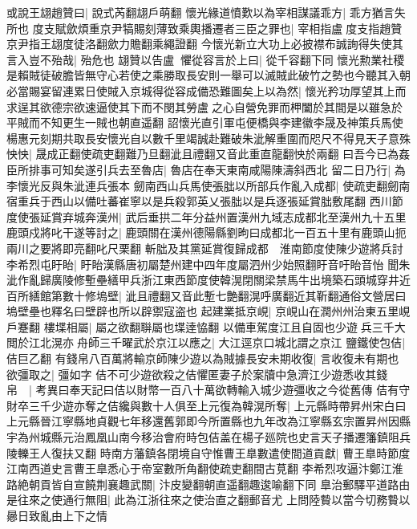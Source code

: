 或說王翃趙贊曰|{
	說式芮翻翃戶萌翻}
懷光緣道憤歎以為宰相謀議乖方|{
	乖方猶言失所也}
度支賦歛煩重京尹犒賜刻薄致乘輿播遷者三臣之罪也|{
	宰相指盧度支指趙贊京尹指王翃度徒洛翻歛力贍翻乘繩證翻}
今懷光新立大功上必披襟布誠詢得失使其言入豈不殆哉|{
	殆危也}
翃贊以告盧懼從容言於上曰|{
	從千容翻下同}
懷光勲業社稷是賴賊徒破膽皆無守心若使之乘勝取長安則一舉可以滅賊此破竹之勢也今聽其入朝必當賜宴留連累日使賊入京城得從容成備恐難圖矣上以為然|{
	懷光矜功厚望其上而求逞其欲德宗欲速逼使其下而不閔其勞盧之心自營免罪而柙闔於其間是以雖急於平賊而不知更生一賊也朝直遥翻}
詔懷光直引軍屯便橋與李建徽李晟及神策兵馬使楊惠元刻期共取長安懷光自以數千里竭誠赴難破朱泚解重圍而咫尺不得見天子意殊怏怏|{
	晟成正翻使疏吏翻難乃旦翻泚且禮翻又音此重直龍翻怏於兩翻}
曰吾今已為姦臣所排事可知矣遂引兵去至魯店|{
	魯店在奉天東南咸陽陳濤斜西北}
留二日乃行|{
	為李懷光反與朱泚連兵張本}
劒南西山兵馬使張朏以所部兵作亂入成都|{
	使疏吏翻劒南宿重兵于西山以備吐蕃崔寧以是兵殺郭英乂張朏以是兵逐張延賞朏敷尾翻}
西川節度使張延賞弃城奔漢州|{
	武后垂拱二年分益州置漢州九域志成都北至漢州九十五里}
鹿頭戍將叱干遂等討之|{
	鹿頭關在漢州德陽縣劉昫曰成都北一百五十里有鹿頭山扼兩川之要將即亮翻叱尺栗翻}
斬朏及其黨延賞復歸成都　淮南節度使陳少遊將兵討李希烈屯盱眙|{
	盱眙漢縣唐初屬楚州建中四年度屬泗州少始照翻盱音吁眙音怡}
聞朱泚作亂歸廣陵修塹壘繕甲兵浙江東西節度使韓滉閉關梁禁馬牛出境築石頭城穿井近百所繕館第數十修塢壁|{
	泚且禮翻又音此塹七艶翻滉呼廣翻近其靳翻通俗文營居曰塢壁壘也釋名曰壁辟也所以辟禦寇盗也}
起建業抵京峴|{
	京峴山在潤州州治東五里峴戶蹇翻}
樓堞相屬|{
	屬之欲翻聨屬也堞逹恊翻}
以備車駕度江且自固也少遊兵三千大閲於江北滉亦舟師三千曜武於京江以應之|{
	大江逕京口城北謂之京江}
鹽鐵使包佶|{
	佶巨乙翻}
有錢帛八百萬將輸京師陳少遊以為賊據長安未期收復|{
	言收復未有期也}
欲彊取之|{
	彊如字}
佶不可少遊欲殺之佶懼匿妻子於案牘中急濟江少遊悉收其錢帛　|{
	考異曰奉天記曰佶以財幣一百八十萬欲轉輸入城少遊彊收之今從舊傳}
佶有守財卒三千少遊亦奪之佶纔與數十人俱至上元復為韓滉所奪|{
	上元縣時帶昇州宋白曰上元縣晉江寧縣地貞觀七年移還舊郭即今所置縣也九年改為江寧縣玄宗置昇州因縣宇為州城縣元治鳳凰山南今移治會府時包佶盖在楊子廵院也史言天子播遷籓鎮阻兵陵轢王人復扶又翻}
時南方藩鎮各閉境自守惟曹王臯數遣使間道貢獻|{
	曹王臯時節度江南西道史言曹王臯悉心于帝室數所角翻使疏吏翻間古莧翻}
李希烈攻逼汴鄭江淮路絶朝貢皆自宣饒荆襄趣武關|{
	汴皮變翻朝直遥翻趣逡喻翻下同}
臯治郵驛平道路由是往來之使通行無阻|{
	此為江浙往來之使治直之翻郵音尤}
上問陸䞇以當今切務䞇以曏日致亂由上下之情

